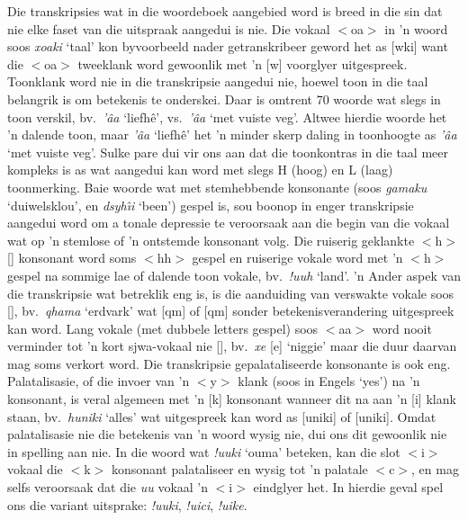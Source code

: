Die transkripsies wat in die woordeboek aangebied word is breed in die
sin dat nie elke faset van die uitspraak aangedui is nie. Die vokaal
$<$oa$>$ in 'n woord soos \emph{\textipa{\textdoublebarpipe}xoaki}
`taal' kon byvoorbeeld nader getranskribeer geword het as
[\textipa{\textdoublebarpipe}wki] want die
$<$oa$>$ tweeklank word gewoonlik met 'n [w] voorglyer uitgespreek.
Toonklank word nie in die transkripsie aangedui nie, hoewel toon in
die taal belangrik is om betekenis te onderskei. Daar is omtrent 70
woorde wat slegs in toon verskil, bv.\
\emph{\textipa{\textdoublevertline}'\^{a}a} `liefh\^{e}', vs.\
\emph{\textipa{\textdoublevertline}'\^{a}a} `met vuiste veg'. Altwee
hierdie woorde het 'n dalende toon, maar
\emph{\textipa{\textdoublevertline}'\^{a}a} `liefh\^{e}' het 'n minder
skerp daling in toonhoogte as
\emph{\textipa{\textdoublevertline}'\^{a}a} `met vuiste veg'. Sulke
pare dui vir ons aan dat die toonkontras in die taal meer kompleks is
as wat aangedui kan word met slegs H (hoog) en L (laag) toonmerking.
Baie woorde wat met stemhebbende konsonante (soos \emph{gamaku}
`duiwelsklou', en \emph{dsyh\^{\i}i} `been') gespel is, sou boonop in
enger transkripsie aangedui word om a tonale depressie te veroorsaak
aan die begin van die vokaal wat op 'n stemlose of 'n ontstemde
konsonant volg. Die ruiserig geklankte $<$h$>$ [\textipa{H}] konsonant
word soms $<$hh$>$ gespel en ruiserige vokale word met 'n $<$h$>$
gespel na sommige lae of dalende toon vokale, bv.\ \emph{!uuh}
`land'. 'n Ander aspek van die transkripsie wat betreklik eng is, is
die aanduiding van verswakte vokale soos [\textipa{@}], bv.\
\emph{\textipa{\textdoublevertline}qhama} `erdvark' wat
[\textipa{\textdoublevertline}qm\textipa{A}]
of
[\textipa{\textdoublevertline}q\textipa{\super{h}}m]
sonder betekenisverandering uitgespreek kan word. Lang vokale (met
dubbele letters gespel) soos $<$aa$>$ word nooit verminder tot 'n kort
sjwa-vokaal nie [\textipa{@}], bv.\
\emph{\textipa{\textvertline}xe}
[\textipa{\textvertline}\textipa{A}\textipa{A}\textipa{X}e] `niggie'
maar die duur daarvan mag soms verkort word. Die transkripsie
gepalataliseerde konsonante is ook eng. Palatalisasie, of die invoer
van 'n $<$y$>$ klank (soos in Engels `yes') na 'n konsonant, is veral
algemeen met 'n [k] konsonant wanneer dit na aan 'n [i] klank staan,
bv.\ \emph{huniki} `alles' wat uitgespreek kan word as
[\textipa{H}uniki] of [\textipa{H}unik\super{j}i]. Omdat palatalisasie
nie die betekenis van 'n woord wysig nie, dui ons dit gewoonlik nie in
spelling aan nie. In die woord wat \emph{!uuki} `ouma' beteken, kan
die slot $<$i$>$ vokaal die $<$k$>$ konsonant palataliseer en wysig
tot 'n palatale $<$c$>$, en mag selfs veroorsaak dat die \emph{uu}
vokaal 'n $<$i$>$ eindglyer het. In hierdie geval spel ons die variant
uitsprake: \emph{!uuki}, \emph{!uici}, \emph{!uike}.\\

